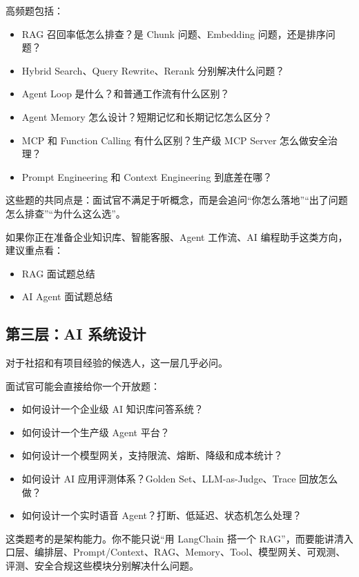 \documentclass[9pt,a4paper,twocolumn]{ctexart}
\begin{document}
高频题包括：


\begin{itemize}[itemsep=1pt, topsep=2pt]
  \item RAG 召回率低怎么排查？是 Chunk 问题、Embedding 问题，还是排序问题？
  \item Hybrid Search、Query Rewrite、Rerank 分别解决什么问题？
  \item Agent Loop 是什么？和普通工作流有什么区别？
  \item Agent Memory 怎么设计？短期记忆和长期记忆怎么区分？
  \item MCP 和 Function Calling 有什么区别？生产级 MCP Server 怎么做安全治理？
  \item Prompt Engineering 和 Context Engineering 到底差在哪？
\end{itemize}


这些题的共同点是：面试官不满足于听概念，而是会追问“你怎么落地”“出了问题怎么排查”“为什么这么选”。



如果你正在准备企业知识库、智能客服、Agent 工作流、AI 编程助手这类方向，建议重点看：


\begin{itemize}[itemsep=1pt, topsep=2pt]
  \item RAG 面试题总结
  \item AI Agent 面试题总结
\end{itemize}


\subsection*{第三层：AI 系统设计}


对于社招和有项目经验的候选人，这一层几乎必问。



面试官可能会直接给你一个开放题：


\begin{itemize}[itemsep=1pt, topsep=2pt]
  \item 如何设计一个企业级 AI 知识库问答系统？
  \item 如何设计一个生产级 Agent 平台？
  \item 如何设计一个模型网关，支持限流、熔断、降级和成本统计？
  \item 如何设计 AI 应用评测体系？Golden Set、LLM-as-Judge、Trace 回放怎么做？
  \item 如何设计一个实时语音 Agent？打断、低延迟、状态机怎么处理？
\end{itemize}


这类题考的是架构能力。你不能只说“用 LangChain 搭一个 RAG”，而要能讲清入口层、编排层、Prompt/Context、RAG、Memory、Tool、模型网关、可观测、评测、安全合规这些模块分别解决什么问题。
\end{document}
